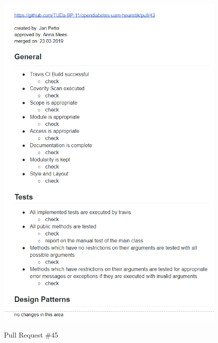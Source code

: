 \documentclass[accentcolor=tud0b,12pt,paper=a4]{tudreport}
\begin{document}
\begin{figure}[h]
\centering
\caption{Pull Request \#45}
\includegraphics[width=\textwidth,height=\textheight,keepaspectratio]{pr-45}
\label{pr:45}
\end{figure}
\end{document}
